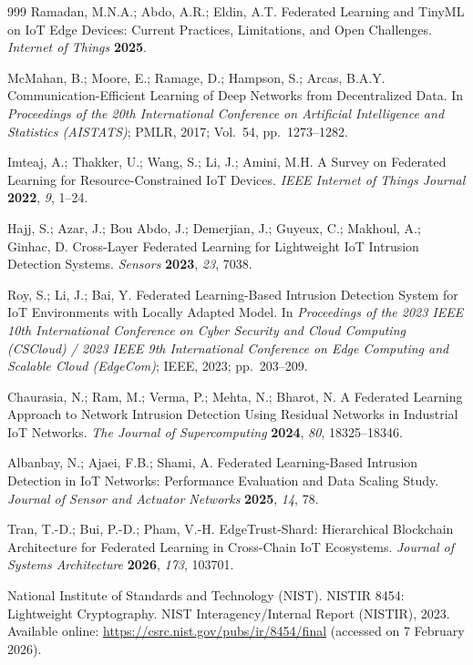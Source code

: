 \documentclass[journal,article,submit,moreauthors]{Definitions/mdpi}
\begin{document}
{\begin{thebibliography}{999}
Ramadan, M.N.A.; Abdo, A.R.; Eldin, A.T. Federated Learning and TinyML on IoT Edge Devices: Current Practices, Limitations, and Open Challenges. \emph{Internet of Things} \textbf{2025}.

McMahan, B.; Moore, E.; Ramage, D.; Hampson, S.; Arcas, B.A.Y. Communication-Efficient Learning of Deep Networks from Decentralized Data. In \emph{Proceedings of the 20th International Conference on Artificial Intelligence and Statistics (AISTATS)}; PMLR, 2017; Vol.~54, pp.~1273--1282.

Imteaj, A.; Thakker, U.; Wang, S.; Li, J.; Amini, M.H. A Survey on Federated Learning for Resource-Constrained IoT Devices. \emph{IEEE Internet of Things Journal} \textbf{2022}, \emph{9}, 1--24.

Hajj, S.; Azar, J.; Bou Abdo, J.; Demerjian, J.; Guyeux, C.; Makhoul, A.; Ginhac, D. Cross-Layer Federated Learning for Lightweight IoT Intrusion Detection Systems. \emph{Sensors} \textbf{2023}, \emph{23}, 7038.

Roy, S.; Li, J.; Bai, Y. Federated Learning-Based Intrusion Detection System for IoT Environments with Locally Adapted Model. In \emph{Proceedings of the 2023 IEEE 10th International Conference on Cyber Security and Cloud Computing (CSCloud) / 2023 IEEE 9th International Conference on Edge Computing and Scalable Cloud (EdgeCom)}; IEEE, 2023; pp.~203--209.

Chaurasia, N.; Ram, M.; Verma, P.; Mehta, N.; Bharot, N. A Federated Learning Approach to Network Intrusion Detection Using Residual Networks in Industrial IoT Networks. \emph{The Journal of Supercomputing} \textbf{2024}, \emph{80}, 18325--18346.

Albanbay, N.; Ajaei, F.B.; Shami, A. Federated Learning-Based Intrusion Detection in IoT Networks: Performance Evaluation and Data Scaling Study. \emph{Journal of Sensor and Actuator Networks} \textbf{2025}, \emph{14}, 78.

Tran, T.-D.; Bui, P.-D.; Pham, V.-H. EdgeTrust-Shard: Hierarchical Blockchain Architecture for Federated Learning in Cross-Chain IoT Ecosystems. \emph{Journal of Systems Architecture} \textbf{2026}, \emph{173}, 103701.

National Institute of Standards and Technology (NIST). NISTIR 8454: Lightweight Cryptography.
NIST Interagency/Internal Report (NISTIR), 2023. Available online: \url{https://csrc.nist.gov/pubs/ir/8454/final} (accessed on 7 February 2026).


\end{thebibliography}}
\end{document}
